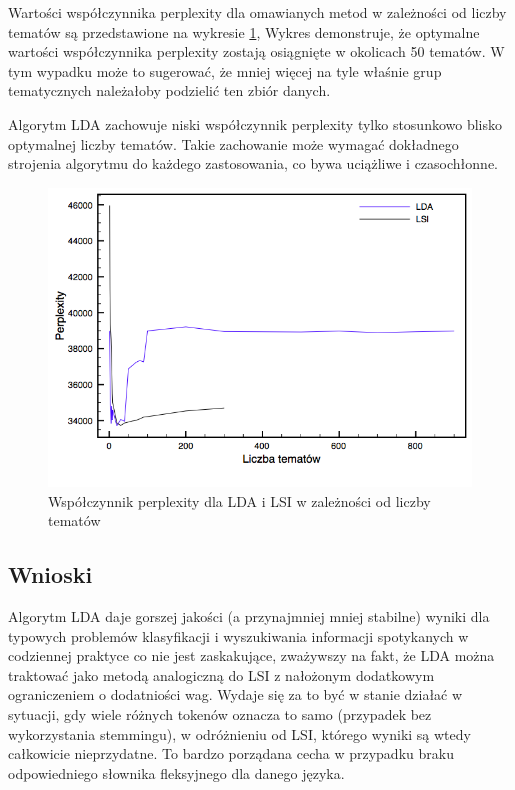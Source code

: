 \documentclass[11pt,a4paper]{article}
\begin{document}
Wartości współczynnika perplexity dla omawianych metod w zależności od liczby
tematów są przedstawione na wykresie \ref{fig:perplexity}, Wykres demonstruje,
że optymalne wartości współczynnika perplexity zostają osiągnięte w okolicach
50 tematów. W tym wypadku może to sugerować, że mniej więcej na tyle właśnie
grup tematycznych należałoby podzielić ten zbiór danych.

Algorytm LDA zachowuje niski współczynnik perplexity tylko stosunkowo blisko
optymalnej liczby tematów. Takie zachowanie może wymagać dokładnego strojenia
algorytmu do każdego zastosowania, co bywa uciążliwe i czasochłonne.

\begin{figure}[h]
\includegraphics[width=\linewidth]{gfx/perplexity.png}
\caption{Współczynnik perplexity dla LDA i LSI w zależności od liczby tematów}
\label{fig:perplexity}
\end{figure}

\FloatBarrier

\subsection{Wnioski}

Algorytm LDA daje gorszej jakości (a przynajmniej mniej stabilne) wyniki dla
typowych problemów klasyfikacji i wyszukiwania informacji spotykanych w
codziennej praktyce co nie jest zaskakujące, zważywszy na fakt, że LDA można
traktować jako metodą analogiczną do LSI z nałożonym dodatkowym ograniczeniem o
dodatniości wag. Wydaje się za to być w stanie działać w sytuacji, gdy wiele
różnych tokenów oznacza to samo (przypadek bez wykorzystania stemmingu), w
odróżnieniu od LSI, którego wyniki są wtedy całkowicie nieprzydatne. To bardzo
porządana cecha w przypadku braku odpowiedniego słownika fleksyjnego dla danego
języka.
\end{document}
